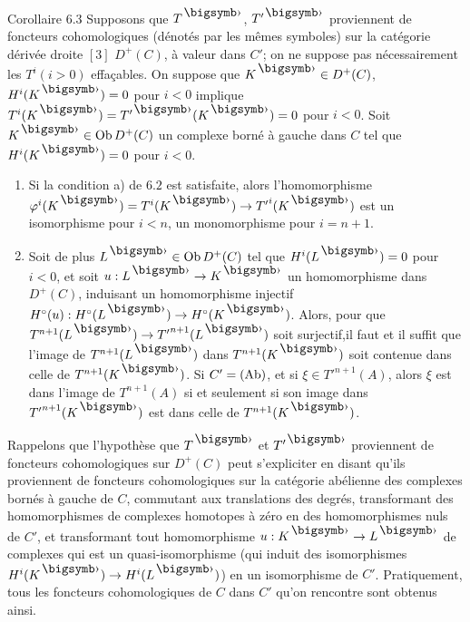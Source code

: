 \documentclass[10pt]{../fichiers-configuration-latex/smfart}
\begin{document}
\begin{enonce*}{Corollaire 6.3}
Supposons que $T^{\bigdot}$, ${T'^{\bigdot}}$ proviennent de foncteurs
cohomologiques (dénotés par les mêmes symboles) sur la catégorie
dérivée droite $[3]$ $D^{+}(C)$, à valeur dans $C'$; on ne suppose pas
nécessairement les $T^{i}(i>0)$ effaçables. On suppose que
$K^{\bigdot}\in D^{+}(C)$, $H^{i}(K^{\bigdot})=0$ pour $i<0$ implique 
$T^{i}(K^{\bigdot})=T'^{\bigdot}(K^{\bigdot})=0$ pour $i<0$. Soit
$K^{\bigdot}\in \Ob D^{+}(C)$ un complexe borné à gauche dans $C$ tel
que $H^{i}(K^{\bigdot})=0$ pour $i<0$.
\begin{enumerate}
\renewcommand{\theenumi}{\roman{enumi}}
\renewcommand{\labelenumi}{(\theenumi)}
\item Si la condition {\rm a)} de $6.2$ est satisfaite, alors
  l'homomorphisme
  $\varphi^{i}(K^{\bigdot})=T^{i}(K^{\bigdot})\rightarrow
  {T'}^{i}(K^{\bigdot})$ est un isomorphisme pour $i<n$, un
  monomorphisme pour $i=n+1$.

\item Soit de plus $L^{\bigdot}\in \Ob D^{+}(C)$ tel que
  $H^{i}(L^{\bigdot})=0$ pour $i<0$, et soit $u:L^{\bigdot}\rightarrow
  K^{\bigdot}$ un homomorphisme dans $D^{+}(C)$, induisant un
  homomorphisme injectif
  $H^{\circ}(u):H^{\circ}(L^{\bigdot})\rightarrow
  H^{\circ}(K^{\bigdot})$. Alors, pour que
  $T^{n+1}(L^{\bigdot})\rightarrow {T'}^{n+1}(L^{\bigdot})$ soit
  surjectif,\pageoriginale il faut et il suffit que l'image de
  $T^{n+1}(L^{\bigdot})$ dans $T^{n+1}(K^{\bigdot})$ soit contenue dans
  celle de $T^{n+1}(K^{\bigdot})$. Si $C'=(\operatorname{Ab})$, et si $\xi \in
  {T'}^{n+1}(A)$, alors $\xi$ est dans l'image de $T^{n+1}(A)$ si et
  seulement si son image dans ${T'}^{n+1}(K^{\bigdot})$ est dans celle
  de $T^{n+1}(K^{\bigdot})$.
\end{enumerate}
\end{enonce*}

Rappelons que l'hypothèse que $T^{\bigdot}$ et $T'^{\bigdot}$
proviennent de foncteurs cohomologiques sur $D^{+}(C)$ peut
s'expliciter en disant qu'ils proviennent de foncteurs cohomologiques
sur la catégorie abélienne des complexes bornés à gauche de $C$,
commutant aux translations des degrés, transformant des homomorphismes
de complexes homotopes à zéro en des homomorphismes nuls de $C'$, et
transformant tout homomorphisme $u:K^{\bigdot}\rightarrow L^{\bigdot}$
de complexes qui est un quasi-isomorphisme (\ie qui induit des
isomorphismes $H^{i}(K^{\bigdot})\rightarrow H^{i}(L^{\bigdot})$) en un
isomorphisme de $C'$. Pratiquement, tous les foncteurs cohomologiques
de $C$ dans $C'$ qu'on rencontre sont obtenus ainsi.
\end{document}
